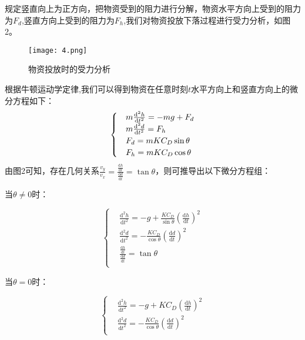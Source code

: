 \documentclass[normalsize]{ctexart}
\begin{document}
\par 规定竖直向上为正方向，把物资受到的阻力进行分解，物资水平方向上受到的阻力为$F_d$,竖直方向上受到的阻力为$F_h$,我们对物资投放下落过程进行受力分析，如图2。
\begin{figure}[h]
	
	\centering
	\texttt{[image: 4.png]}
	\caption{物资投放时的受力分析}
	
\end{figure}
\par
根据牛顿运动学定律,我们可以得到物资在任意时刻$t$水平方向上和竖直方向上的微分方程如下：
\begin{equation}
	\begin{cases}
		&m\frac{\mathrm{d}^2h}{\mathrm{d}t^2}=-mg+F_d\\
		&m\frac{\mathrm{d}^2d}{\mathrm{d}t^2}=F_h $$\\
		&F_d=mKC_D\sin\theta\\
		&F_h=mKC_D\cos\theta\\
		
	\end{cases}
\end{equation}
由图2可知，存在几何关系$\frac{v_y}{v_x}=\frac{\frac{\mathrm{d}h}{\mathrm{d}t}}{\frac{\mathrm{d}d}{\mathrm{d}t}}=\tan\theta$，则可推导出以下微分方程组：
\begin{center}
	当$\theta\neq0$时：
\end{center}
\begin{equation}
	\begin{cases}
		& \frac{\mathrm{d}^2h}{\mathrm{d}t^2}=-g+\frac{KC_D}{\sin\theta}(\frac{\mathrm{d}h}{\mathrm{d}t})^2\\
		& \frac{\mathrm{d}^2d}{\mathrm{d}t^2}=-\frac{KC_D}{\cos\theta}(\frac{\mathrm{d}d}{\mathrm{d}t})^2\\
		& \frac{\frac{\mathrm{d}h}{\mathrm{d}t}}{\frac{\mathrm{d}d}{\mathrm{d}t}}=\tan \theta\\
		
		
	\end{cases}
\end{equation}
\begin{center}
	当$\theta=0$时：
\end{center}
\begin{equation}
	\begin{cases}
		& \frac{\mathrm{d}^2h}{\mathrm{d}t^2}=-g+KC_D(\frac{\mathrm{d}h}{\mathrm{d}t})^2\\
		& \frac{\mathrm{d}^2d}{\mathrm{d}t^2}=-\frac{KC_D}{\cos\theta}(\frac{\mathrm{d}d}{\mathrm{d}t})^2\\		
	\end{cases}
\end{equation}
\end{document}
